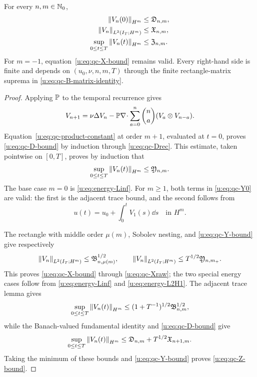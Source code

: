 \begin{lemma}
\label{u:lem:qc-closed-velocity-majorants}
For every \(n,m\in\mathbb N_0\),
\begin{align}
 \left\lVert V_n(0)\right\rVert_{H^m}&\le\mathfrak D_{n,m},
 \label{u:eq:qc-D-bound}\\
 \left\lVert V_n\right\rVert_{L^2(I_T;H^m)}&\le\mathfrak X_{n,m},
 \label{u:eq:qc-X-bound}\\
 \sup_{0\le t\le T}\left\lVert V_n(t)\right\rVert_{H^m}
 &\le\mathfrak Z_{n,m}.
 \label{u:eq:qc-Z-bound}
\end{align}
For \(m=-1\), equation~\eqref{u:eq:qc-X-bound} remains valid.  Every
right-hand side is finite and depends on \((u_0,\nu,n,m,T)\) through the
finite rectangle-matrix suprema in \eqref{u:eq:qc-B-matrix-identity}.
\end{lemma}

\begin{proof}
Applying \(\mathbb P\) to the temporal recurrence gives
\begin{equation}
 V_{n+1}=\nu\Delta V_n
 -\mathbb P\nabla\!\cdot\sum_{a=0}^{n}\binom na
 (V_a\otimes V_{n-a}).
 \label{u:eq:qc-projected-temporal-recurrence}
\end{equation}
Equation~\eqref{u:eq:qc-product-constant} at order \(m+1\), evaluated at
\(t=0\), proves \eqref{u:eq:qc-D-bound} by induction through
\eqref{u:eq:qc-Drec}.  This estimate, taken pointwise on \([0,T]\),
proves by induction that
\begin{equation}
 \sup_{0\le t\le T}\left\lVert V_n(t)\right\rVert_{H^m}
 \le\mathfrak Y_{n,m}.
 \label{u:eq:qc-Y-bound}
\end{equation}
The base case \(m=0\) is \eqref{u:eq:energy-Linf}.  For \(m\ge1\), both
terms in \eqref{u:eq:qc-Y0} are valid: the first is the adjacent trace bound,
and the second follows from
\[
 u(t)=u_0+\int_0^tV_1(s)\dd s
 \quad\text{in }H^m.
\]

The rectangle with middle order \(\mu(m)\), Sobolev nesting, and
\eqref{u:eq:qc-Y-bound} give respectively
\[
 \left\lVert V_n\right\rVert_{L^2(I_T;H^m)}
 \le\mathfrak B_{n,\mu(m)}^{1/2},
 \qquad
 \left\lVert V_n\right\rVert_{L^2(I_T;H^m)}
 \le T^{1/2}\mathfrak Y_{n,m_+}.
\]
This proves \eqref{u:eq:qc-X-bound} through \eqref{u:eq:qc-Xraw}; the two
special energy cases follow from \eqref{u:eq:energy-Linf} and
\eqref{u:eq:energy-L2H1}.  The adjacent trace lemma gives
\[
 \sup_{0\le t\le T}\left\lVert V_n(t)\right\rVert_{H^m}
 \le(1+T^{-1})^{1/2}\mathfrak B_{n,m}^{1/2},
\]
while the Banach-valued fundamental identity and
\eqref{u:eq:qc-D-bound} give
\[
 \sup_{0\le t\le T}\left\lVert V_n(t)\right\rVert_{H^m}
 \le\mathfrak D_{n,m}+T^{1/2}\mathfrak X_{n+1,m}.
\]
Taking the minimum of these bounds and \eqref{u:eq:qc-Y-bound} proves
\eqref{u:eq:qc-Z-bound}.
\end{proof}

